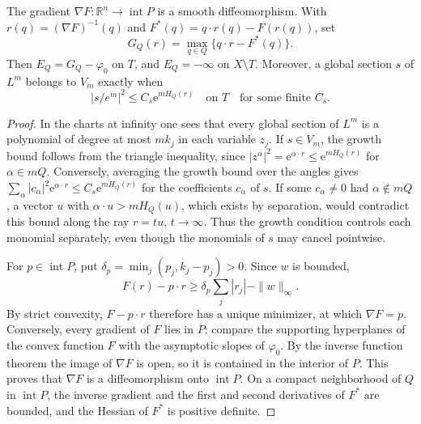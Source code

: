 \begin{lemma}\label{lem:newton-growth-envelope}
The gradient $\nabla F\colon\mathbb R^n\to\operatorname{int}P$ is a smooth
diffeomorphism. With $r(q)=(\nabla F)^{-1}(q)$ and
$F^*(q)=q\cdot r(q)-F(r(q))$, set
\[
 G_Q(r)=\max_{q\in Q}\{q\cdot r-F^*(q)\}.
\]
Then $E_Q=G_Q-\varphi_0$ on $T$, and $E_Q=-\infty$ on $X\setminus T$. Moreover, a global section $s$ of $L^m$ belongs
to $V_m$ exactly when
\begin{equation}\label{eq:newton-entire-growth}
 |s/e^m|^2\leq C_s\mathrm e^{mH_Q(r)}\quad\text{on }T
 \quad\text{for some finite }C_s.
\end{equation}
\end{lemma}
\begin{proof}
In the charts at infinity one sees that every global section of $L^m$ is a polynomial of degree at most $mk_j$ in each variable $z_j$. If $s\in V_m$, the growth bound follows from the triangle inequality, since $|z^\alpha|^2=\mathrm e^{\alpha\cdot r}\leq\mathrm e^{mH_Q(r)}$ for $\alpha\in mQ$. Conversely, averaging the growth bound over the angles gives
$\sum_\alpha|c_\alpha|^2\mathrm e^{\alpha\cdot r}
\leq C_s\mathrm e^{mH_Q(r)}$ for the coefficients $c_\alpha$ of $s$. If some $c_\alpha\neq0$ had $\alpha\notin mQ$, a vector $u$ with $\alpha\cdot u>mH_Q(u)$, which exists by separation, would contradict this bound along the ray $r=tu$, $t\to\infty$. Thus the growth condition controls each monomial separately, even though the monomials of $s$ may cancel pointwise.

For $p\in\operatorname{int}P$, put
$\delta_p=\min_j(p_j,k_j-p_j)>0$. Since $w$ is bounded,
\begin{equation}\label{eq:newton-coercivity}
 F(r)-p\cdot r\geq\delta_p\sum_j|r_j|-\|w\|_\infty.
\end{equation}
By strict convexity, $F-p\cdot r$ therefore has a unique minimizer, at which $\nabla F=p$. Conversely, every gradient of $F$ lies in $P$: compare the supporting hyperplanes of the convex function $F$ with the asymptotic slopes of $\varphi_0$. By the inverse function theorem the image of $\nabla F$ is open, so it is contained in the interior of $P$. This proves that $\nabla F$ is a diffeomorphism onto $\operatorname{int}P$.
On a compact neighborhood of $Q$ in $\operatorname{int}P$, the inverse gradient and the first and second derivatives of $F^*$ are bounded, and the Hessian of $F^*$ is positive definite.


\end{proof}
